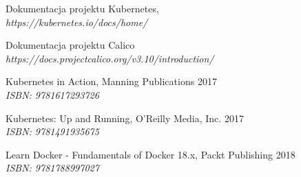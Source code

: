 \documentclass[pl,final,oneside]{mgr} %
\begin{document}


\begin{thebibliography}{99}
	Dokumentacja projektu Kubernetes,
	\\ \textit{https://kubernetes.io/docs/home/}
	
	Dokumentacja projektu Calico \\
	\textit{https://docs.projectcalico.org/v3.10/introduction/}

	Kubernetes in Action, Manning Publications 2017 \\
	\textit{ISBN: 9781617293726}
	
	Kubernetes: Up and Running, O'Reilly Media, Inc. 2017 \\
	\textit{ISBN: 9781491935675}
	
	Learn Docker - Fundamentals of Docker 18.x, Packt Publishing 2018\\
	\textit{ISBN: 9781788997027}

\end{thebibliography}
\end{document}
